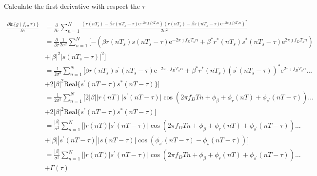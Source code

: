 \documentclass[12pt,a4paper,twoside,english]{article}
\begin{document}
Calculate the first derivative with respect the $\tau$

\begin{align}\label{eq.:first_derivative_tau}
   \frac{\partial \textrm{ln}\{g(f_D,\tau)\} }{\partial  \tau} & = \frac{\partial }{\partial  \tau} \sum_{n=1}^{N}\frac{\left(r(nT_s) - \beta s(nT_s - \tau)\textrm{e}^{-2\pi \jmath f_DT_s n}\right)\left(r(nT_s) - \beta s(nT_s - \tau)\textrm{e}^{-2\pi \jmath f_DT_s n}\right)^{*}}{2\sigma^2} \nonumber\\
                                                               &= \frac{\partial }{\partial  \tau} \frac{1}{2\sigma^2} \sum_{n=1}^{N}[-\left(\beta r(nT_s)s(nT_s - \tau)\textrm{e}^{-2\pi \jmath f_DT_s n} + \beta^{*} r^{*}(nT_s)s^{*}(nT_s - \tau)\textrm{e}^{2\pi \jmath f_DT_s n}\right) \nonumber \\
                                                               & + |\beta|^{2}|s(nT_s - \tau)|^{2}] \nonumber \\
                                                               &= \frac{1}{2\sigma ^2} \sum_{n=1}^{N}[\beta r(nT_s)s^{\prime}(nT_s - \tau)\textrm{e}^{-2\pi \jmath f_DT_s n} + \beta^{*} r^{*}(nT_s)(s^{\prime}(nT_s - \tau))^{*}\textrm{e}^{2\pi \jmath f_DT_s n} \ldots \nonumber \\
                                                               & + 2|\beta|^2\textrm{Real}\{ s^{\prime}(nT - \tau)s^{*}(nT - \tau)\}]   \nonumber \\
                                                               & = \frac{1}{2\sigma ^2} \sum_{n=1}^{N} [2|\beta||r(nT)|s^{\prime}(nT - \tau)|\cos{(2\pi f_DT n + \phi_{\beta} + \phi_r(nT) + \phi_{s^{\prime}}(nT - \tau))} \ldots   \nonumber \\
                                                               & + 2|\beta|^2\textrm{Real}\{ s^{\prime}(nT - \tau)s^{*}(nT - \tau) ] \nonumber \\
                                                               & = \frac{|\beta|}{\sigma ^{2}}\sum_{n=1}^{N}[|r(nT)|s^{\prime}(nT - \tau)| \cos{(2\pi f_DT n + \phi_{\beta} + \phi_r(nT) + \phi_{s^{\prime}}(nT - \tau))} \ldots \nonumber \\
                                                               & + |\beta||s^{\prime}(nT - \tau)||s(nT - \tau)|\cos{(\phi_{s^{\prime}}(nT - \tau) - \phi_{s}(nT - \tau))}] \nonumber \\
                                                               & = \frac{|\beta|}{\sigma ^{2}}\sum_{n=1}^{N}[|r(nT)|s^{\prime}(nT - \tau)| \cos{(2\pi f_DT n + \phi_{\beta} + \phi_r(nT) + \phi_{s^{\prime}}(nT - \tau))} \ldots \nonumber \\
  & + \Gamma (\tau) 
\end{align}
\end{document}
